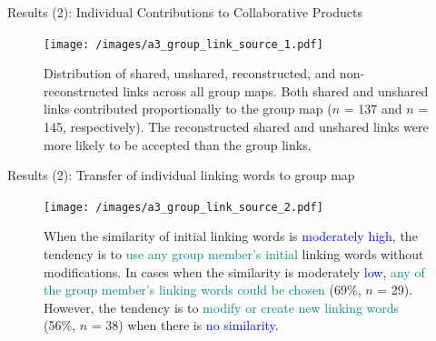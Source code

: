 \begin{frame}{Results (2): Individual Contributions to Collaborative Products}
    \begin{figure}[tb]
        \begin{center}
            \texttt{[image: /images/a3\_group\_link\_source\_1.pdf]}
        \end{center}
        \caption{Distribution of shared, unshared, reconstructed, and non-reconstructed links across all group maps. Both shared and unshared links contributed proportionally to the group map ($n$ = 137 and $n$ = 145, respectively). The reconstructed shared and unshared links were more likely to be accepted than the group links.}
        \label{group_link_s1}
    \end{figure}
\end{frame}



\begin{frame}{Results (2): Transfer of individual linking words to group map}
    \begin{figure}[tb]
        \begin{center}
            \texttt{[image: /images/a3\_group\_link\_source\_2.pdf]}
        \end{center}
        \caption{{\footnotesize When the similarity of initial linking words is \textcolor{blue}{moderately high}, the tendency is to \textcolor{teal}{use any group member's initial} linking words without modifications. In cases when the similarity is moderately \textcolor{blue}{low}, \textcolor{teal}{any of the group member's linking words could be chosen} (69\%, $n$ = 29). However, the tendency is to \textcolor{teal}{modify or create new linking words} (56\%, $n$ = 38) when there is \textcolor{blue}{no similarity}.}}
        \label{group_link_s2}
    \end{figure}
\end{frame}


    

